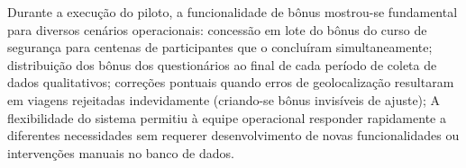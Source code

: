 Durante a execução do piloto, a
funcionalidade de bônus mostrou-se fundamental para diversos cenários operacionais:
concessão em lote do bônus do curso de segurança para centenas de participantes que
o concluíram simultaneamente; distribuição dos bônus dos questionários ao final de
cada período de coleta de dados qualitativos; correções pontuais quando erros de
geolocalização resultaram em viagens rejeitadas indevidamente (criando-se bônus
invisíveis de ajuste); A flexibilidade do sistema permitiu à
equipe operacional responder rapidamente a diferentes necessidades sem requerer
desenvolvimento de novas funcionalidades ou intervenções manuais no banco de dados.



